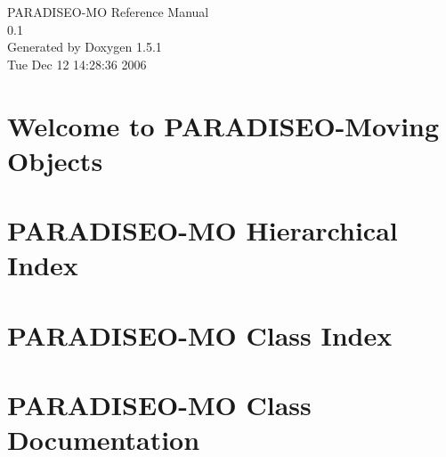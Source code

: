 \documentclass[a4paper]{book}
\begin{document}
\begin{titlepage}
\vspace*{7cm}
\begin{center}
{\Large PARADISEO-MO Reference Manual\\[1ex]\large 0.1 }\\
\vspace*{1cm}
{\large Generated by Doxygen 1.5.1}\\
\vspace*{0.5cm}
{\small Tue Dec 12 14:28:36 2006}\\
\end{center}
\end{titlepage}
\clearemptydoublepage
{}
\tableofcontents
\clearemptydoublepage
{}
\chapter{Welcome to PARADISEO-Moving Objects }
\label{index}
\chapter{PARADISEO-MO Hierarchical Index}

\chapter{PARADISEO-MO Class Index}

\chapter{PARADISEO-MO Class Documentation}




























\printindex
\end{document}
